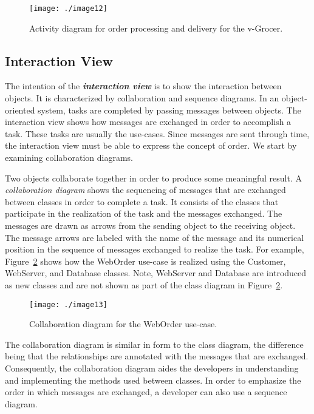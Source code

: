 \begin{figure}[h]
\centering
\texttt{[image: ./image12]}
\caption{Activity diagram for order processing and delivery
for the v-Grocer.}
\label{figure:activityDiagramVgrocer}
\end{figure}

\subsection{Interaction View}
\label{subsection:interaction-view}

The intention of the \emph{\textbf{interaction view}} is to show the
interaction between objects. It is characterized by collaboration and
sequence diagrams. In an object-oriented system, tasks are completed by
passing messages between objects. The interaction view shows how
messages are exchanged in order to accomplish a task. These tasks are
usually the use-cases. Since messages are sent through time, the
interaction view must be able to express the concept of order. We start
by examining collaboration diagrams.

Two objects collaborate together in order to produce some meaningful
result. A \emph{collaboration diagram} shows the sequencing of messages
that are exchanged between classes in order to complete a task. It
consists of the classes that participate in the realization of the task
and the messages exchanged. The messages are drawn as arrows from the
sending object to the receiving object. The message arrows are labeled
with the name of the message and its numerical position in the sequence
of messages exchanged to realize the task. For example, 
Figure~\ref{figure:collaborationDiagramWebOrder}
shows how the WebOrder use-case is realized using the Customer,
WebServer, and Database classes. Note, WebServer and Database are
introduced as new classes and are not shown as part of the class diagram
in Figure~\ref{figure:collaborationDiagramWebOrder}.

\begin{figure}[h]
\centering
\texttt{[image: ./image13]}
\caption{Collaboration diagram for the WebOrder use-case.}
\label{figure:collaborationDiagramWebOrder}
\end{figure}


The collaboration diagram is similar in form to the class diagram, the
difference being that the relationships are annotated with the messages
that are exchanged. Consequently, the collaboration diagram aides the
developers in understanding and implementing the methods used between
classes. In order to emphasize the order in which messages are
exchanged, a developer can also use a sequence diagram.

